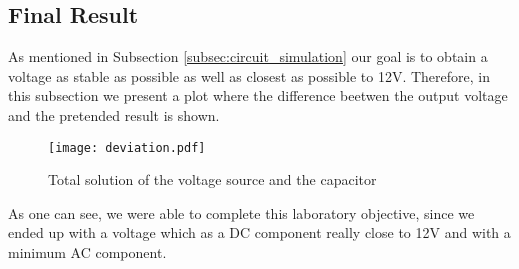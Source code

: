 \subsection{Final Result}

\par As mentioned in Subsection \ref{subsec:circuit_simulation} our goal is to obtain a voltage as stable as possible as well as closest as possible to 12V. Therefore, in this subsection we present a plot where the difference beetwen the output voltage and the pretended result is shown.

\begin{figure}[H] \centering
\texttt{[image: deviation.pdf]}
\caption{Total solution of the voltage source and the capacitor}
\label{fig:vo-12}
\end{figure}


As one can see, we were able to complete this laboratory objective, since we ended up with a voltage which as a DC component really close to 12V and with a minimum AC component.



